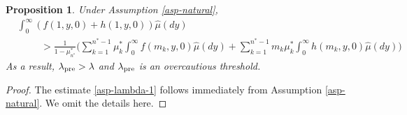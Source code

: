 \documentclass[12pt]{amsart}
\newtheorem{thm}{Theorem}[section]
\newtheorem{prop}{Proposition}[section]
\theoremstyle{remark}
\newtheorem{rem}{Remark}
\numberwithin{equation}{section}
\numberwithin{equation}{section}
\newcommand{\1}{\boldsymbol{1}}
\def\hat{\widehat}
\begin{document}
\begin{prop}\label{thm-53}	
		Under Assumption \ref{asp-natural},
	\begin{equation}\label{asp-lambda-1}
	\begin{aligned}
	&\int_0^\infty (f(1,y,0)+h(1,y,0))\hat\mu(dy)\\
	&\hspace{1cm}>\frac 1{1-\mu_{n^*}^*}\Big(\sum_{k=1}^{n^*-1}\mu^*_k\int_0^\infty f(m_k,y,0)\hat\mu(dy)+\sum_{k=1}^{n^*-1} m_k\mu^*_k\int_0^\infty h(m_k,y,0)\hat\mu(dy)\Big)
	\end{aligned}
	\end{equation}
As a result, $\lambda_{{\rm\tiny pre}}>\lambda$ and $\lambda_{{\rm\tiny pre}}$ is an overcautious threshold.
\end{prop}

\begin{proof}
	The estimate \eqref{asp-lambda-1} follows immediately from Assumption \ref{asp-natural}. We omit the details here.
\end{proof}
\end{document}
